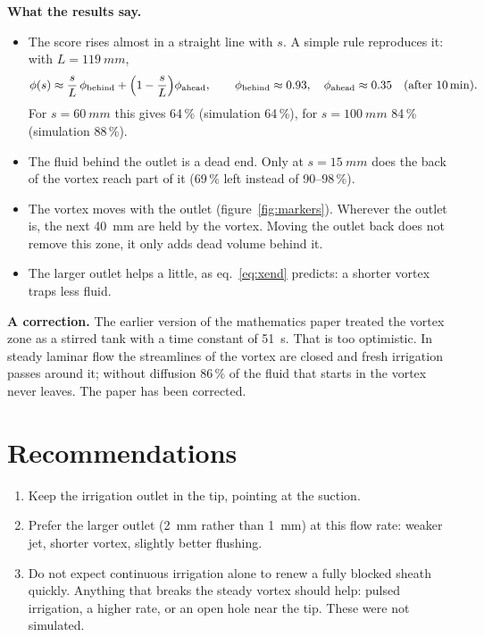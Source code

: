 \documentclass[10pt,a4paper]{article}
\begin{document}
\textbf{What the results say.}
\begin{itemize}\setlength\itemsep{1pt}
\item The score rises almost in a straight line with $s$. A simple rule reproduces it: with $L=\SI{119}{mm}$,
\begin{equation}
\phi(s)\approx\frac{s}{L}\,\phi_{\rm behind}+\Bigl(1-\frac{s}{L}\Bigr)\phi_{\rm ahead},\qquad
\phi_{\rm behind}\approx0.93,\quad \phi_{\rm ahead}\approx0.35\quad\text{(after \SI{10}{min})}.
\end{equation}
For $s=\SI{60}{mm}$ this gives 64\,\% (simulation 64\,\%), for $s=\SI{100}{mm}$ 84\,\% (simulation 88\,\%).
\item The fluid behind the outlet is a dead end. Only at $s=\SI{15}{mm}$ does the back of the vortex reach
part of it (69\,\% left instead of 90--98\,\%).
\item The vortex moves with the outlet (figure~\ref{fig:markers}). Wherever the outlet is, the next
\SI{40}{mm} are held by the vortex. Moving the outlet back does not remove this zone, it only adds dead
volume behind it.
\item The larger outlet helps a little, as eq.~\eqref{eq:xend} predicts: a shorter vortex traps less fluid.
\end{itemize}

\textbf{A correction.} The earlier version of the mathematics paper treated the vortex zone as a stirred tank
with a time constant of \SI{51}{s}. That is too optimistic. In steady laminar flow the streamlines of the
vortex are closed and fresh irrigation passes around it; without diffusion 86\,\% of the fluid that starts in
the vortex never leaves. The paper has been corrected.

\section{Recommendations}
\begin{enumerate}\setlength\itemsep{1pt}
\item Keep the irrigation outlet in the tip, pointing at the suction.
\item Prefer the larger outlet (\SI{2}{mm} rather than \SI{1}{mm}) at this flow rate: weaker jet, shorter
vortex, slightly better flushing.
\item Do not expect continuous irrigation alone to renew a fully blocked sheath quickly. Anything that
breaks the steady vortex should help: pulsed irrigation, a higher rate, or an open hole near the tip.
These were not simulated.
\end{enumerate}
\end{document}
